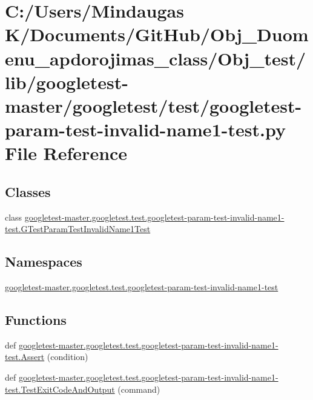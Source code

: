 \hypertarget{_obj__test_2lib_2googletest-master_2googletest_2test_2googletest-param-test-invalid-name1-test_8py}{}\section{C\+:/\+Users/\+Mindaugas K/\+Documents/\+Git\+Hub/\+Obj\+\_\+\+Duomenu\+\_\+apdorojimas\+\_\+class/\+Obj\+\_\+test/lib/googletest-\/master/googletest/test/googletest-\/param-\/test-\/invalid-\/name1-\/test.py File Reference}
\label{_obj__test_2lib_2googletest-master_2googletest_2test_2googletest-param-test-invalid-name1-test_8py}
\subsection*{Classes}
\begin{DoxyCompactItemize}
\item 
class \mbox{\hyperlink{classgoogletest-master_1_1googletest_1_1test_1_1googletest-param-test-invalid-name1-test_1_1_g_tf880334fd9d35194c26b114edbd24da2}{googletest-\/master.\+googletest.\+test.\+googletest-\/param-\/test-\/invalid-\/name1-\/test.\+G\+Test\+Param\+Test\+Invalid\+Name1\+Test}}
\end{DoxyCompactItemize}
\subsection*{Namespaces}
\begin{DoxyCompactItemize}
\item 
 \mbox{\hyperlink{namespacegoogletest-master_1_1googletest_1_1test_1_1googletest-param-test-invalid-name1-test}{googletest-\/master.\+googletest.\+test.\+googletest-\/param-\/test-\/invalid-\/name1-\/test}}
\end{DoxyCompactItemize}
\subsection*{Functions}
\begin{DoxyCompactItemize}
\item 
def \mbox{\hyperlink{namespacegoogletest-master_1_1googletest_1_1test_1_1googletest-param-test-invalid-name1-test_aa119907f7d75161d3a22c00ccc0e2386}{googletest-\/master.\+googletest.\+test.\+googletest-\/param-\/test-\/invalid-\/name1-\/test.\+Assert}} (condition)
\item 
def \mbox{\hyperlink{namespacegoogletest-master_1_1googletest_1_1test_1_1googletest-param-test-invalid-name1-test_a480ff8744eca4b3451008e41e00a4cf3}{googletest-\/master.\+googletest.\+test.\+googletest-\/param-\/test-\/invalid-\/name1-\/test.\+Test\+Exit\+Code\+And\+Output}} (command)
\end{DoxyCompactItemize}
